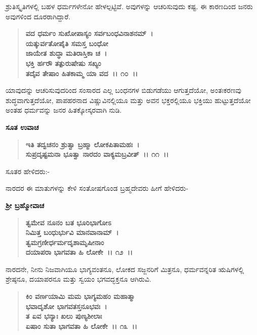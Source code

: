 ಶ್ರುತಿಸ್ಕೃತಿಗಳಲ್ಲಿ ಬಹಳ ಧರ್ಮಗಳೇನೋ ಹೇಳಲ್ಪಟ್ಟಿವೆ. ಅವುಗಳನ್ನು ಆಚರಿಸುವುದು ಕಷ್ಟ. ಈ ಕಾರಣದಿಂದ ಜನರು ಅವುಗಳಿಂದ ದೂರರಾಗಿದ್ದಾರೆ.

\begin{verse}
\textbf{ವದ ಧರ್ಮಂ ಸುಖೋಪಾಸ್ಯಂ ಸರ್ವಬಂಧವಿನಾಶನಮ್~।}\\\textbf{ಯತ್ಕುರ್ವತೋಪೈತಿ ಸಮಸ್ತ ಬಂಧೋ }\\\textbf{ಜಾಯೇತ ಶುದ್ಧಾ ಮತಿರಾಸ್ತಿಕಾ ಚ~।}\\\textbf{ಭಕ್ತಿ ರ್ಹರೌ ತತ್ಪುರುಷೇಷು ಸಖ್ಯಂ }\\\textbf{ತದೈವ ತೇಷಾಂ ಹಿತಕಾಮ್ಮ ಯಾ ವದ~।। ೧೦~।।}
\end{verse}

ಯಾವುದನ್ನು ಆಚರಿಸುವುದರಿಂದ ಸಂಸಾರದ ಎಲ್ಲ ಬಂಧನಗಳ ಬಿಡುಗಡೆಯು ಆಗುತ್ತದೆಯೋ, ಅಂತಃಕರಣವು ಶುದ್ಧವಾಗುತ್ತದೆಯೋ, ಪಾಪಹರನಾದ ವಿಷ್ಣುವಿನಲ್ಲಿಯೂ ಮತ್ತು ಅವನ ಭಕ್ತರಲ್ಲಿಯೂ ಭಕ್ತಿಯು ಹುಟ್ಟುತ್ತದೆಯೋ ಅಂತಹ ಧರ್ಮವನ್ನು ಜನರ ಹಿತಕ್ಕೋಸ್ಕರವಾಗಿ ನುಡಿ.

\begin{flushleft}
\textbf{ಸೂತ ಉವಾಚ\enginline{-}}
\end{flushleft}

\begin{verse}
\textbf{ಇತಿ ತದ್ವಚನಂ ಶ್ರುತ್ವಾ ಬ್ರಹ್ಮಾ ಲೋಕಪಿತಾಮಹಃ~।}\\\textbf{ಸುಪ್ರದೃಷ್ಟಮನಾ ಭೂತ್ವಾ ನಾರದಂ ವಾಕ್ಯಮಬ್ರವೀತ್~।। ೧೧~।।}
\end{verse}

\noindent
ಸೂತರ ಹೇಳಿದರು:-

ನಾರದರ ಈ ಮಾತುಗಳನ್ನು ಕೇಳಿ ಸಂತೋಷಗೊಂಡ ಬ್ರಹ್ಮದೇವರು ಹೀಗೆ ಹೇಳಿದರು-

\begin{flushleft}
\textbf{ಶ‍್ರೀ ಬ್ರಹ್ಮೋವಾಚ\enginline{-}}
\end{flushleft}

\begin{verse}
\textbf{ತ್ವಮೇವ ನೂನಂ ಬತ ಭೂರಿಭಾಗೋಽ}\\\textbf{ನಿಮಿತ್ತ ಬಂಧುರ್ಭುವಿ ಮಾನವಾನಾಮ್~।}\\\textbf{ತ್ವಮಗ್ರಣೀರ್ಧರ್ಮದೃಶಾಮೃಷೀನಾಂ } \\\textbf{ದಯಾಪರಾ ಭಾಗವತಾ ಹಿ ಲೋಕೇ~।। ೧೨~।।}
\end{verse}

ನಾರದನೇ, ನೀನು ನಿಜವಾಗಿಯೂ ಭಾಗ್ಯವಂತನೂ, ಲೋಕದ ಸಜ್ಜನರಿಗೆ ಮಿತ್ರನೂ, ಧರ್ಮವನ್ನರಿತ ಋಷಿಗಳಲ್ಲಿ ಶ್ರೇಷ್ಠನೂ, ದಯಾಪರನೂ ಮತ್ತು ಸ್ವಯಂ ಭಗವದ್ಭಕ್ತನೂ ಆಗಿರುವಿ.

\begin{verse}
\textbf{ಕಿಂ ವರ್ಣಯಾಮಿ ಮಮ ಭಾಗ್ಯಮಹಂ ಮಹಾತ್ಮಾ}\\\textbf{ಭವಾದೃಶೋ ಭಾಗವತಸ್ತನೂಭವಃ~।}\\\textbf{ತ ಏವ ಭನ್ಯಾಃ ಖಲು ಪುಣ್ಯಶೀಲಾಃ}\\\textbf{ಏಷಾಂ ಸುತಾ ಭಾಗವತಾ ಹಿ ಲೋಕೇ~।। ೧೩~।।}
\end{verse}

